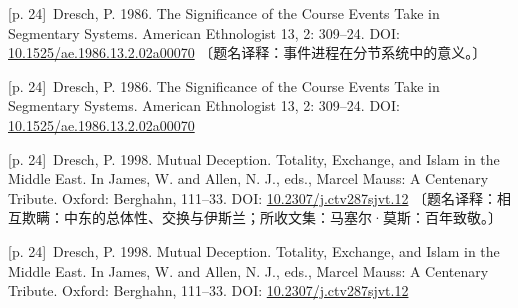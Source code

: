 \documentclass[10pt,a4paper]{article}
\begin{document}
\noindent\begin{minipage}{\textwidth}\begin{minipage}[t]{\dimexpr.5\textwidth-4mm\relax}\noindent\begin{minipage}[t]{\linewidth}{\scriptsize\color{gray} [p. 24]}\ Dresch, P. 1986. The Significance of the Course Events Take in Segmentary Systems. American Ethnologist 13, 2: 309–24. DOI: \url{10.1525/ae.1986.13.2.02a00070} 〔题名译释：事件进程在分节系统中的意义。〕\par\end{minipage}\par\end{minipage}\hfill\begin{minipage}[t]{\dimexpr.5\textwidth-4mm\relax}\noindent\begin{minipage}[t]{\linewidth}{\scriptsize\color{gray} [p. 24]}\ Dresch, P. 1986. The Significance of the Course Events Take in Segmentary Systems. American Ethnologist 13, 2: 309–24. DOI: \url{10.1525/ae.1986.13.2.02a00070}\par\end{minipage}\par\end{minipage}\end{minipage}\par
\noindent\begin{minipage}{\textwidth}\begin{minipage}[t]{\dimexpr.5\textwidth-4mm\relax}\noindent\begin{minipage}[t]{\linewidth}{\scriptsize\color{gray} [p. 24]}\ Dresch, P. 1998. Mutual Deception. Totality, Exchange, and Islam in the Middle East. In James, W. and Allen, N. J., eds., Marcel Mauss: A Centenary Tribute. Oxford: Berghahn, 111–33. DOI: \url{10.2307/j.ctv287sjvt.12} 〔题名译释：相互欺瞒：中东的总体性、交换与伊斯兰；所收文集：马塞尔·莫斯：百年致敬。〕\par\end{minipage}\par\end{minipage}\hfill\begin{minipage}[t]{\dimexpr.5\textwidth-4mm\relax}\noindent\begin{minipage}[t]{\linewidth}{\scriptsize\color{gray} [p. 24]}\ Dresch, P. 1998. Mutual Deception. Totality, Exchange, and Islam in the Middle East. In James, W. and Allen, N. J., eds., Marcel Mauss: A Centenary Tribute. Oxford: Berghahn, 111–33. DOI: \url{10.2307/j.ctv287sjvt.12}\par\end{minipage}\par\end{minipage}\end{minipage}\par
\end{document}
